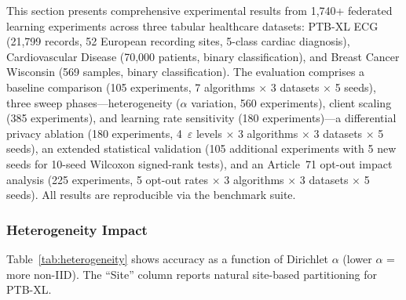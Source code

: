 \documentclass[conference]{IEEEtran}
\begin{document}
This section presents comprehensive experimental results from 1,740+ federated learning experiments across three tabular healthcare datasets: PTB-XL ECG (21,799 records, 52 European recording sites, 5-class cardiac diagnosis), Cardiovascular Disease (70,000 patients, binary classification), and Breast Cancer Wisconsin (569 samples, binary classification). The evaluation comprises a baseline comparison (105 experiments, 7 algorithms $\times$ 3 datasets $\times$ 5 seeds), three sweep phases---heterogeneity ($\alpha$ variation, 560 experiments), client scaling (385 experiments), and learning rate sensitivity (180 experiments)---a differential privacy ablation (180 experiments, 4~$\varepsilon$ levels $\times$ 3 algorithms $\times$ 3 datasets $\times$ 5 seeds), an extended statistical validation (105 additional experiments with 5 new seeds for 10-seed Wilcoxon signed-rank tests), and an Article~71 opt-out impact analysis (225 experiments, 5 opt-out rates $\times$ 3 algorithms $\times$ 3 datasets $\times$ 5 seeds). All results are reproducible via the benchmark suite.

\subsubsection{Heterogeneity Impact}

Table~\ref{tab:heterogeneity} shows accuracy as a function of Dirichlet $\alpha$ (lower $\alpha$ = more non-IID). The ``Site'' column reports natural site-based partitioning for PTB-XL.
\end{document}
